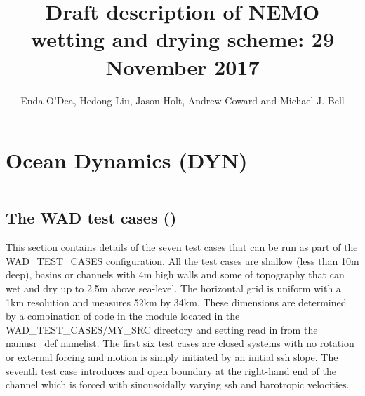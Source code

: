



\title{Draft description of NEMO wetting and drying scheme:     29 November 2017 }

\author{ Enda O'Dea, Hedong Liu, Jason Holt, Andrew Coward  and Michael J. Bell  }


\chapter{Ocean Dynamics (DYN)}
\label{DYN}
\minitoc


$\ $\newline    %

 
\section   [The WAD test cases (\textit{usrdef\_zgr})]
			{The WAD test cases ()}
\label{WAD_test_cases}

This section contains details of the seven test cases that can be run as part of the
WAD\_TEST\_CASES configuration. All the test cases are shallow (less than 10m deep),
basins or channels with 4m high walls and some of topography that can wet and dry up to
2.5m above sea-level. The horizontal grid is uniform with a 1km resolution and measures
52km by 34km. These dimensions are determined by a combination of code in the
 module located in the WAD\_TEST\_CASES/MY\_SRC directory and setting
read in from the namusr\_def namelist. The first six test cases are closed systems with no
rotation or external forcing and motion is simply initiated by an initial ssh slope. The
seventh test case introduces and open boundary at the right-hand end of the channel which
is forced with sinousoidally varying ssh and barotropic velocities.

